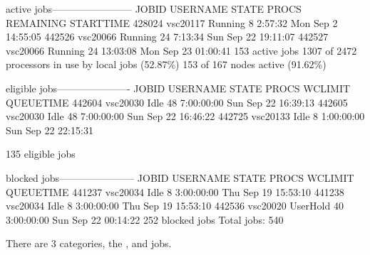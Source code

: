 \begin{prompt}
active jobs------------------------
JOBID     USERNAME  STATE PROCS REMAINING          STARTTIME
428024    vsc20117  Running   8   2:57:32  Mon Sep  2 14:55:05
442526    vsc20066  Running  24   7:13:34  Sun Sep 22 19:11:07
442527    vsc20066  Running  24  13:03:08  Mon Sep 23 01:00:41
153 active jobs 1307 of 2472 processors in use by local jobs (52.87\%)
153 of 167 nodes active      (91.62\%)

eligible jobs----------------------
JOBID     USERNAME  STATE PROCS   WCLIMIT            QUEUETIME
442604    vsc20030   Idle  48  7:00:00:00  Sun Sep 22 16:39:13
442605    vsc20030   Idle  48  7:00:00:00  Sun Sep 22 16:46:22
442725    vsc20133   Idle   8  1:00:00:00  Sun Sep 22 22:15:31

135 eligible jobs

blocked jobs-----------------------
JOBID   USERNAME     STATE PROCS WCLIMIT            QUEUETIME
441237  vsc20034      Idle   8 3:00:00:00 Thu Sep 19 15:53:10
441238  vsc20034      Idle   8 3:00:00:00 Thu Sep 19 15:53:10
442536  vsc20020  UserHold  40 3:00:00:00 Sun Sep 22 00:14:22
252 blocked jobs
Total jobs:  540
\end{prompt}
\fi

There are 3 categories, the ,  and  jobs.

